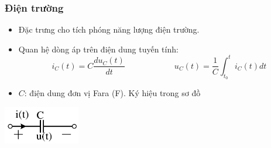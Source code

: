 \subsubsection{Điện trường}
\begin{itemize}
  \item Đặc trưng cho tích phóng năng lượng điện trường.
  \item Quan hệ dòng áp trên điện dung tuyến tính:
    \begin{equation}
      i_C(t) = C\frac{du_C(t)}{dt} \hspace{1in} u_C(t)=\frac{1}{C}\int_{t_0}^{t} i_C(t)dt 
    \end{equation}
  \item $C$: điện dung đơn vị Fara (F). Ký hiệu trong sơ đồ
\end{itemize}
\begin{center}
  \includegraphics[width=0.25\textwidth]{./image/6.png}
\end{center}
